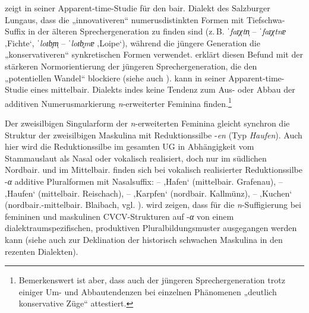 \citet[131--132]{Mauser2000} zeigt in seiner Apparent-time-Studie für den bair. Dialekt des Salzburger Lungaus, dass die „innovativeren“ numerusdistinkten Formen mit Tiefschwa-Suffix in der älteren Sprechergeneration zu finden sind (z.\,B. \textit{ˈfaɪχtn̩} -- \textit{ˈfaɪχtnɐ} ‚Fichte‘, \textit{ˈloɪb̥m̩} -- \textit{ˈloɪb̥mɐ} ‚Loipe‘), während die jüngere Generation die „konservativeren“ synkretischen Formen verwendet. \citet[132]{Mauser2000} erklärt diesen Befund mit der stärkeren Normorientierung der jüngeren Sprechergeneration, die den „potentiellen Wandel“ blockiere (siehe auch \citealt[216]{Mauser1998a}). \citet[187--188]{Wildfeuer2001} kann in seiner Apparent-time-Studie eines mittelbair. Dialekts indes keine Tendenz zum Aus- oder Abbau der additiven Numerusmarkierung \textit{n}{}-erweiterter Feminina finden.\footnote{Bemerkenswert ist aber, dass auch \citet[218]{Wildfeuer2001} der jüngeren Sprechergeneration trotz einiger Um- und Abbautendenzen bei einzelnen Phänomenen „deutlich konservative Züge“ attestiert.}\largerpage[2]

\begin{sloppypar}
Der zweisilbigen Singularform der \textit{n}{}-erweiterten Feminina gleicht synchron die Struktur der zweisilbigen Maskulina mit Reduktionssilbe -\textit{en} (Typ \textit{Haufen}). Auch hier wird die Reduktionssilbe im gesamten UG in Abhängigkeit vom Stammauslaut als Nasal oder vokalisch realisiert, doch nur im südlichen Nordbair. und im Mittelbair. finden sich bei vokalisch realisierter Reduktionssilbe -\textit{α} additive Pluralformen mit Nasalsuffix:  --  ‚Hafen‘ (mittelbair. Grafenau),  --  ‚Haufen‘ (mittelbair. Rei\-schach),  --  ‚Karpfen‘ (nordbair. Kallmünz),  --  ‚Kuchen‘ (nordbair.-mittelbair. Blaibach, vgl. \citealt[128 und 160]{Rowley1997}).  wird zeigen, dass für die \textit{n}{}-Suffigierung bei femininen und maskulinen CVCV-Strukturen auf -\textit{α} von einem dialektraumspezifischen, produktiven Pluralbildungsmuster ausgegangen werden kann (siehe auch  zur Deklination der historisch schwachen Maskulina in den rezenten Dialekten).
\end{sloppypar}

